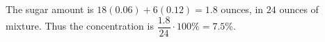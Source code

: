 The sugar amount is $18(0.06)+6(0.12)=1.8$ ounces, in $24$ ounces of mixture. Thus the concentration is $\dfrac{1.8}{24}\cdot100\%=\boxed{7.5\%}$.
